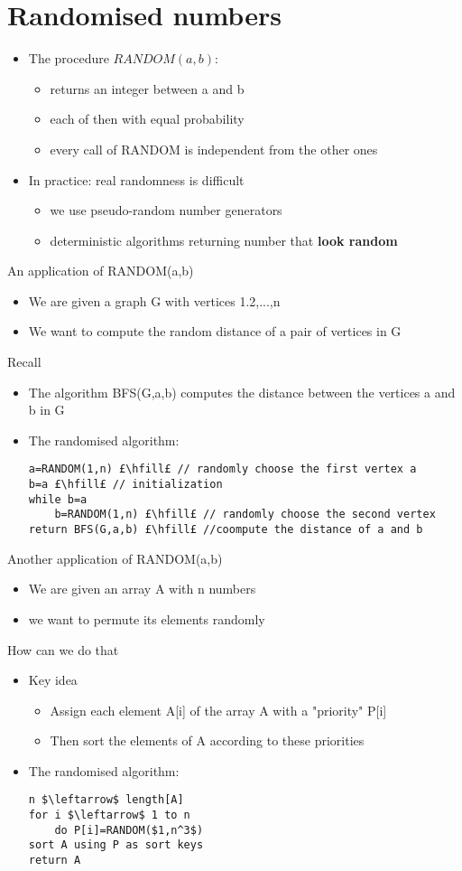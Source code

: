 \documentclass{article}[18pt]
\begin{document}
\section{Randomised numbers}
\begin{itemize}
	\item The procedure $RANDOM(a,b)$:
	\begin{itemize}
		\item returns an integer between a and b
		\item each of then with equal probability
		\item every call of RANDOM is independent from the other ones
	\end{itemize}
	\item In practice: real randomness is difficult
	\begin{itemize}
		\item we use pseudo-random number generators
		\item deterministic algorithms returning number that \textbf{look random}
	\end{itemize}
\end{itemize}
An application of RANDOM(a,b)
\begin{itemize}
	\item We are given a graph G with vertices 1.2,...,n
	\item We want to compute the random distance of a pair of vertices in G
\end{itemize}
Recall
\begin{itemize}
	\item The algorithm BFS(G,a,b) computes the distance between the vertices a and b in G
	\item The randomised algorithm:
	\begin{lstlisting}[caption=Random\_Distance(G)]
a=RANDOM(1,n) £\hfill£ // randomly choose the first vertex a
b=a £\hfill£ // initialization
while b=a
	b=RANDOM(1,n) £\hfill£ // randomly choose the second vertex 
return BFS(G,a,b) £\hfill£ //coompute the distance of a and b
	\end{lstlisting}
\end{itemize}
Another application of RANDOM(a,b)
\begin{itemize}
	\item We are given an array A with n numbers
	\item we want to permute its elements randomly
\end{itemize}
How can we do that
\begin{itemize}
	\item Key idea
	\begin{itemize}
		\item Assign each element A[i] of the array A with a "priority" P[i]
		\item Then sort the elements of A according to these priorities
	\end{itemize}
	\item The randomised algorithm:
\begin{lstlisting}[caption=Permute-By-Sorting(A)]
n $\leftarrow$ length[A]
for i $\leftarrow$ 1 to n
	do P[i]=RANDOM($1,n^3$)
sort A using P as sort keys
return A
\end{lstlisting}
\end{itemize}
\end{document}

